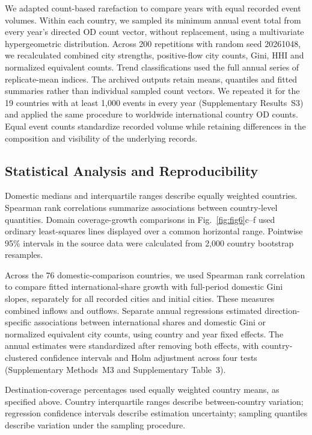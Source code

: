 We adapted count-based rarefaction\cite{gotelli2001} to compare years with equal recorded event volumes. Within each country, we sampled its minimum annual event total from every year's directed OD count vector, without replacement, using a multivariate hypergeometric distribution. Across 200 repetitions with random seed 20261048, we recalculated combined city strengths, positive-flow city counts, Gini, HHI and normalized equivalent counts. Trend classifications used the full annual series of replicate-mean indices. The archived outputs retain means, quantiles and fitted summaries rather than individual sampled count vectors. We repeated it for the 19 countries with at least 1,000 events in every year (Supplementary Results~S3) and applied the same procedure to worldwide international country OD counts. Equal event counts standardize recorded volume while retaining differences in the composition and visibility of the underlying records.

\subsection{Statistical Analysis and Reproducibility}

Domestic medians and interquartile ranges describe equally weighted countries. Spearman rank correlations\cite{spearman1904} summarize associations between country-level quantities. Domain coverage-growth comparisons in Fig.~\ref{fig:fig6}c--f used ordinary least-squares lines displayed over a common horizontal range. Pointwise 95\% intervals in the source data were calculated from 2,000 country bootstrap resamples\cite{efron1979}.

Across the 76 domestic-comparison countries, we used Spearman rank correlation to compare fitted international-share growth with full-period domestic Gini slopes, separately for all recorded cities and initial cities. These measures combined inflows and outflows. Separate annual regressions estimated direction-specific associations between international shares and domestic Gini or normalized equivalent city counts, using country and year fixed effects. The annual estimates were standardized after removing both effects, with country-clustered confidence intervals and Holm adjustment across four tests (Supplementary Methods~M3 and Supplementary Table~3).

Destination-coverage percentages used equally weighted country means, as specified above. Country interquartile ranges describe between-country variation; regression confidence intervals describe estimation uncertainty; sampling quantiles describe variation under the sampling procedure.

